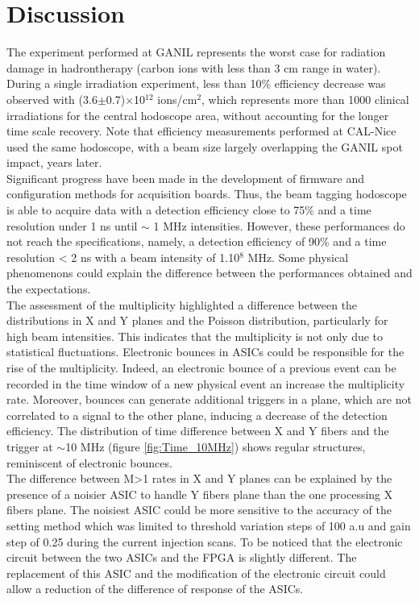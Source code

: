 \documentclass[a4paper,11pt]{article}
\begin{document}
\section{Discussion}

The experiment performed at GANIL represents the worst case for radiation damage in hadrontherapy (carbon ions with less than 3 cm range in water). During a single irradiation experiment, less than 10\% efficiency decrease was observed with (3.6$\pm$0.7)$\times$10$^{12}$ ions/cm$^{2}$, which represents more than 1000 clinical irradiations for the central hodoscope area, without accounting for the longer time scale recovery. Note that efficiency measurements performed at CAL-Nice used the same hodoscope, with a beam size largely overlapping the GANIL spot impact, years later.\\

Significant progress have been made in the development of firmware and configuration methods for acquisition boards. Thus, the beam tagging hodoscope is able to acquire data with a detection efficiency close to 75\% and a time resolution under 1 ns until $\sim$ 1 MHz intensities. However, these performances do not reach the specifications, namely, a detection efficiency of 90\% and a time resolution < 2 ns with a  beam intensity of 1.10$^{8}$ MHz. Some physical phenomenons could explain the difference between the performances obtained and the expectations.\\

The assessment of the multiplicity highlighted a difference between the distributions in X and Y planes and the Poisson distribution, particularly for high beam intensities. This indicates that the multiplicity is not only due to statistical fluctuations. Electronic bounces in ASICs could be responsible for the rise of the multiplicity. Indeed, an electronic bounce of a previous event can be recorded in the time window of a new physical event an increase the multiplicity rate. Moreover, bounces can generate additional triggers in a plane, which are not correlated to a signal to the other plane, inducing a decrease of the detection efficiency. The distribution of time difference between X and Y fibers and the trigger at $\sim$10 MHz (figure \ref{fig:Time_10MHz}) shows regular structures, reminiscent of electronic bounces.\\

The difference between M>1 rates in X and Y planes can be explained by the presence of a noisier ASIC to handle Y fibers plane than the one processing X fibers plane. The noisiest ASIC could be more sensitive to the accuracy of the setting method which was limited to threshold variation steps of 100 a.u and gain step of 0.25 during the current injection scans. To be noticed that the electronic circuit between the two ASICs and the FPGA is slightly different. The replacement of this ASIC and the modification of the electronic circuit could allow a reduction of the difference of response of the ASICs.
\end{document}
